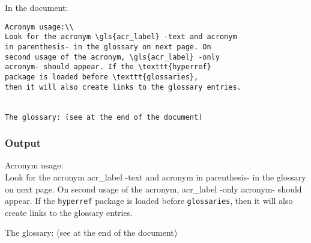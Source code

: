 In the document:
\begin{lstlisting}
Acronym usage:\\
Look for the acronym \gls{acr_label} -text and acronym
in parenthesis- in the glossary on next page. On
second usage of the acronym, \gls{acr_label} -only
acronym- should appear. If the \texttt{hyperref}
package is loaded before \texttt{glossaries},
then it will also create links to the glossary entries.


The glossary: (see at the end of the document)
\end{lstlisting}


\subsubsection{Output}

Acronym usage:\\
Look for the acronym \gls{acr_label} -text and acronym
in parenthesis- in the glossary on next page. On
second usage of the acronym, \gls{acr_label} -only
acronym- should appear. If the \texttt{hyperref}
package is loaded before \texttt{glossaries},
then it will also create links to the glossary entries.


The glossary: (see at the end of the document)
